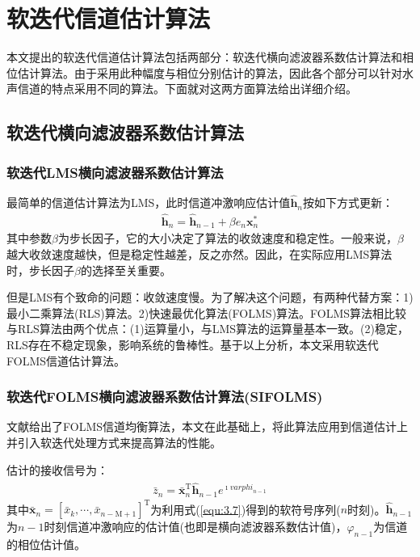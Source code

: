 \section{软迭代信道估计算法}
本文提出的软迭代信道估计算法包括两部分：软迭代横向滤波器系数估计算法和相位估计算法。由于采用此种幅度与相位分别估计的算法，因此各个部分可以针对水声信道的特点采用不同的算法。下面就对这两方面算法给出详细介绍。
\subsection{软迭代横向滤波器系数估计算法}
\subsubsection*{软迭代LMS横向滤波器系数估计算法}
最简单的信道估计算法为LMS，此时信道冲激响应估计值$\hat{\mathbf{h}}_n$按如下方式更新：
\begin{eqnarray}
    \hat{\mathbf{h}}_n=\hat{\mathbf{h}}_{n-1}+\beta e_n\mathbf{x}_n^*
    \label{equ:4.6}
\end{eqnarray}
其中参数$\beta$为步长因子，它的大小决定了算法的收敛速度和稳定性。一般来说，$\beta$越大收敛速度越快，但是稳定性越差，反之亦然。因此，在实际应用LMS算法时，步长因子$\beta$的选择至关重要。

但是LMS有个致命的问题：收敛速度慢。为了解决这个问题，有两种代替方案：1)最小二乘算法(RLS)算法。2)快速最优化算法(FOLMS)\citep{Geller1996}算法。FOLMS算法相比较与RLS算法由两个优点：(1)运算量小，与LMS算法的运算量基本一致。(2)稳定，RLS存在不稳定现象，影响系统的鲁棒性。基于以上分析，本文采用软迭代FOLMS信道估计算法。
\subsubsection*{软迭代FOLMS横向滤波器系数估计算法(SIFOLMS)}
文献给出了FOLMS信道均衡算法，本文在此基础上，将此算法应用到信道估计上并引入软迭代处理方式来提高算法的性能。

估计的接收信号为：
\begin{eqnarray}
    \bar{z}_n=\bar{\mathbf{x}}_n^{\mathrm{T}}\hat{\mathbf{h}}_{n-1}e^{\imath\hat{varphi}_{n-1}}
    \label{equ:4.7}
\end{eqnarray}
其中$\bar{\mathbf{x}}_n=[\bar{x}_k,\cdots,\bar{x}_{n-\mathrm{M}+1}]^{\mathrm{T}}$为利用式(\ref{equ:3.7})得到的软符号序列($n$时刻)。$\hat{\mathbf{h}}_{n-1}$为$n-1$时刻信道冲激响应的估计值(也即是横向滤波器系数估计值)，$\hat{\varphi}_{n-1}$为信道的相位估计值。

